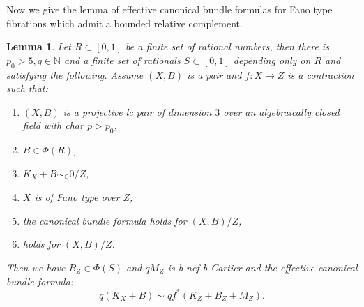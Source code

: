 \documentclass[letterpaper,reqno,12pt]{amsart}
\numberwithin{equation}{section}
\theoremstyle{plain}
\newtheorem{lemma}[theorem]{Lemma}
\begin{document}
Now we give the lemma of effective canonical bundle formulas for Fano type fibrations which admit a bounded relative complement.
\begin{lemma}
\label{effcbf}
    Let $ R\subset [0,1]$ be a finite set of rational numbers, then there is $p_0>5,q\in\mathbb N$ and a finite set of rationals $ S\subset[0,1]$ depending only on $ R$ and satisfying the following. Assume $(X,B)$ is a pair and $f:X\to Z$ is a contraction such that:
    \begin{enumerate}
        \item $(X,B)$ is a projective lc pair of dimension $3$ over an algebraically closed field with char $p>p_0$,
        \item  $B\in\Phi( R)$,
        \item $K_X+B\sim_{\mathbb Q} 0/Z$,
        \item $X$ is of Fano type over $Z$,
        \item the canonical bundle formula  holds for $(X,B)/Z$,
        \item {} holds for $(X,B)/Z$.
    \end{enumerate}
    Then we have $B_Z\in \Phi( S)$ and $qM_Z$ is b-nef b-Cartier and the effective canonical bundle formula:
    \[q(K_X+B)\sim qf^*(K_Z+B_Z+M_Z).\]
\end{lemma}
\end{document}
